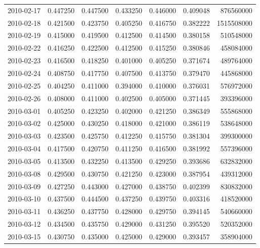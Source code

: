 \begin{tabular}{lrrrrrr}
2010-02-17 &    0.447250 &    0.447500 &    0.433250 &    0.446000 &    0.409048 &   876560000 \\
2010-02-18 &    0.421500 &    0.423750 &    0.405250 &    0.416750 &    0.382222 &  1515508000 \\
2010-02-19 &    0.415000 &    0.419500 &    0.412500 &    0.414500 &    0.380158 &   510548000 \\
2010-02-22 &    0.416250 &    0.422500 &    0.412500 &    0.415250 &    0.380846 &   458084000 \\
2010-02-23 &    0.416500 &    0.418250 &    0.401000 &    0.405250 &    0.371674 &   489764000 \\
2010-02-24 &    0.408750 &    0.417750 &    0.407500 &    0.413750 &    0.379470 &   445868000 \\
2010-02-25 &    0.404250 &    0.411000 &    0.394000 &    0.410000 &    0.376031 &   576972000 \\
2010-02-26 &    0.408000 &    0.411000 &    0.402500 &    0.405000 &    0.371445 &   393396000 \\
2010-03-01 &    0.405250 &    0.423250 &    0.402000 &    0.421250 &    0.386349 &   555868000 \\
2010-03-02 &    0.425000 &    0.430250 &    0.418000 &    0.421000 &    0.386119 &   538648000 \\
2010-03-03 &    0.423500 &    0.425750 &    0.412250 &    0.415750 &    0.381304 &   399300000 \\
2010-03-04 &    0.417500 &    0.420750 &    0.411250 &    0.416500 &    0.381992 &   557396000 \\
2010-03-05 &    0.413500 &    0.432250 &    0.413500 &    0.429250 &    0.393686 &   632832000 \\
2010-03-08 &    0.429500 &    0.430750 &    0.421250 &    0.423000 &    0.387954 &   439312000 \\
2010-03-09 &    0.427250 &    0.443000 &    0.427000 &    0.438750 &    0.402399 &   830832000 \\
2010-03-10 &    0.437500 &    0.444500 &    0.437250 &    0.439750 &    0.403316 &   418520000 \\
2010-03-11 &    0.436250 &    0.437750 &    0.428000 &    0.429750 &    0.394145 &   540660000 \\
2010-03-12 &    0.434500 &    0.435750 &    0.429000 &    0.431250 &    0.395520 &   520352000 \\
2010-03-15 &    0.430750 &    0.435000 &    0.425000 &    0.429000 &    0.393457 &   358904000 \\

\end{tabular}
